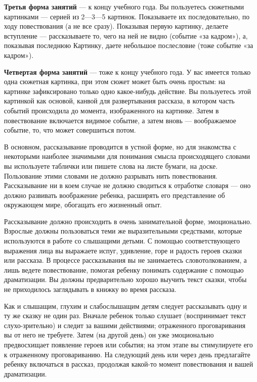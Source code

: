 \documentclass{book}
\begin{document}
\textbf{Третья форма занятий} --- к концу учебного года. Вы пользуетесь
сюжетными картинками --- серией из 2---3---5 картинок. Показываете их
последовательно, по ходу повествования (а не все сразу). Показывая
первую картинку, делаете вступление --- рассказываете то, чего на ней не
видно (событие «за кадром»), а, показывая последнюю Картинку, даете
небольшое послесловие (тоже событие «за кадром»).

\textbf{Четвертая форма занятий} --- тоже к концу учебного года. У вас
имеется только одна сюжетная картинка, при этом сюжет может быть очень
простым: на картинке зафиксировано только одно какое-нибудь действие. Вы
пользуетесь этой картинкой как основой\textsc{,} канвой для
развертывания рассказа, в котором часть событий происходила до момента,
изображенного на картинке. Затем в повествование включается видимое
событие, а затем вновь --- воображаемое событие, то, что может
совершиться потом.

В основном, рассказывание проводится в устной форме, но для знакомства с
некоторыми наиболее значимыми для понимания смысла происходящего словами
вы используете таблички или пишете слова на листе бумаги, на доске.
Пользование этими словами не должно разрывать нить повествования.
Рассказывание ни в коем случае не должно сводиться к отработке словаря
--- оно должно развивать воображение ребенка, расширять его
представление об окружающем мире, обогащать его жизненный опыт.

Рассказывание должно происходить в очень занимательной форме,
эмоционально. Взрослые должны пользоваться теми же выразительными
средствами, которые используются в работе со слышащими детьми. С помощью
соответствующего выражения лица вы выражаете испуг, удивление, горе и
радость героев сказки или рассказа. В процессе рассказывания вы не
занимаетесь словотолкованием, а лишь ведете повествование, помогая
ребенку понимать содержание с помощью драматизации. Вы должны
предварительно хорошо выучить текст сказки, чтобы не приходилось
заглядывать в книжку во время рассказа.

Как и слышащим, глухим и слабослышащим детям следует рассказывать одну и
ту же сказку не один раз. Вначале ребенок только слушает (воспринимает
текст слухо-зрительно) и следит за вашими действиями; отраженного
проговаривания вы от него не требуете. Затем (на другой день) он уже
эмоционально предвосхищает появление героев или события; на этом этапе
вы стимулируете его к отраженному проговариванию. На следующий день или
через день предлагайте ребенку включаться в рассказ, продолжая какой-то
момент повествования и вашей драматизации.
\end{document}
